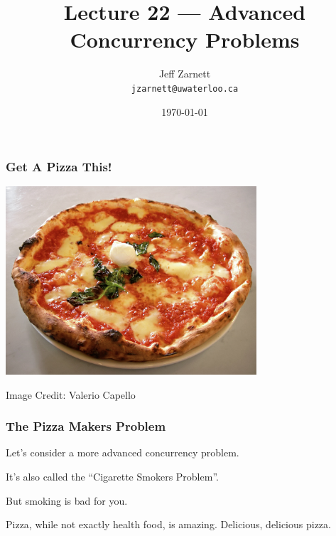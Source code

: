 

\title{Lecture 22 --- Advanced Concurrency Problems }

\author{Jeff Zarnett \\ \small \texttt{jzarnett@uwaterloo.ca}}
\date{\today}




\begin{frame}
  \titlepage

 \end{frame}


\begin{frame}
\frametitle{Get A Pizza This!}
\begin{center}
	\includegraphics[width=0.7\textwidth]{images/pizza.jpg}
\end{center}
\hfill Image Credit: Valerio Capello

\end{frame}

\begin{frame}
\frametitle{The Pizza Makers Problem}

Let's consider a more advanced concurrency problem. 

It's also called the ``Cigarette Smokers Problem''. 

But smoking is bad for you.

Pizza, while not exactly health food, is amazing. Delicious, delicious pizza.


\end{frame}


